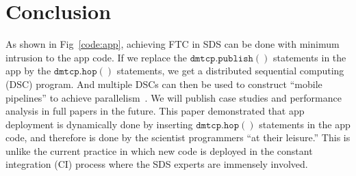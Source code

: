 \documentclass[conference]{IEEEtran}
\begin{document}
\section{Conclusion}
\label{sec:conclusion}

As shown in Fig~\ref{code:app}, achieving FTC in SDS can be done with minimum intrusion to the app code.
If we replace the $\mathtt{dmtcp.publish()}$ statements in the app by the $\mathtt{dmtcp.hop()}$ statements, we get a distributed sequential computing (DSC) program. And multiple DSCs can then be used to construct ``mobile pipelines'' to achieve parallelism~\cite{pan2004navp}. We will publish case studies and performance analysis in full papers in the future. This paper demonstrated that app deployment is dynamically done by inserting $\mathtt{dmtcp.hop()}$ statements in the app code, and therefore is done by the scientist programmers ``at their leisure.'' This is unlike the current practice in which new code is deployed in the constant integration (CI) process where the SDS experts are immensely involved.




\end{document}

